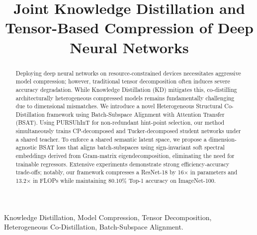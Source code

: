 \documentclass[conference]{IEEEtran}
\begin{document}
\title{Joint Knowledge Distillation and Tensor-Based Compression of Deep Neural Networks}

\author{
}

\maketitle








\begin{abstract}
Deploying deep neural networks on resource-constrained devices necessitates aggressive model compression; however, traditional tensor decomposition often induces severe accuracy degradation. While Knowledge Distillation (KD) mitigates this, co-distilling architecturally heterogeneous compressed models remains fundamentally challenging due to dimensional mismatches. We introduce a novel Heterogeneous Structural Co-Distillation framework using Batch-Subspace Alignment with Attention Transfer (BSAT). Using PURSUhInT for non-redundant hint-point selection, our method simultaneously trains CP-decomposed and Tucker-decomposed student networks under a shared teacher. To enforce a shared semantic latent space, we propose a dimension-agnostic BSAT loss that aligns batch-subspaces using sign-invariant soft spectral embeddings derived from Gram-matrix eigendecomposition, eliminating the need for trainable regressors. Extensive experiments demonstrate strong efficiency-accuracy trade-offs; notably, our framework compresses a ResNet-18 by 16× in parameters and 13.2× in FLOPs while maintaining 80.10\% Top-1 accuracy on ImageNet-100.
\end{abstract}







\begin{IEEEkeywords}
Knowledge Distillation, Model Compression, Tensor Decomposition, Heterogeneous Co-Distillation, Batch-Subspace Alignment.
\end{IEEEkeywords}
\end{document}
